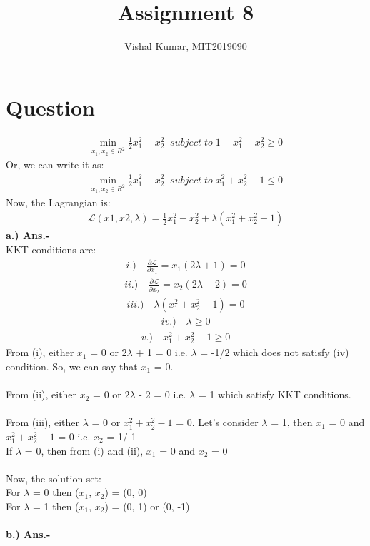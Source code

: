 \documentclass[fleqn]{article}
\title{Assignment 8}
\author{Vishal Kumar, MIT2019090}
\date{}
\begin{document}
\maketitle
\section*{Question}
\begin{align*}
\min_{x_1,x_2 \in R^2} \frac{1}{2} x_1^2 - x_2^2 \;\; subject \; to \; 1 - x_1^2 - x_2^2 \ge 0
\end{align*}
Or, we can write it as:
\begin{align*}
\min_{x_1,x_2 \in R^2} \frac{1}{2} x_1^2 - x_2^2 \;\; subject \; to \; x_1^2 + x_2^2 - 1 \le 0 
\end{align*}
Now, the Lagrangian is:
\begin{align*}
\mathcal{L}(x1,x2,\lambda) = \frac{1}{2} x_1^2 - x_2^2 + \lambda(x_1^2 + x_2^2 - 1)
\end{align*}
{\bf a.) Ans.-}
\\

KKT conditions are:
\begin{align*}
i.)\quad  \frac{\partial \mathcal{L}}{\partial x_1} = x_1(2\lambda +1) = 0 
\end{align*}
\begin{align*}
ii.)\quad  \frac{\partial \mathcal{L}}{\partial x_2} = x_2(2\lambda -2) = 0 
\end{align*}
\begin{align*}
iii.)\quad \lambda( x_1^2 + x_2^2 - 1) = 0 
\end{align*}
\begin{align*}
iv.)\quad \lambda \geq 0
\end{align*}
\begin{align*}
v.)\quad x_1^2 + x_2^2 - 1 \geq 0
\end{align*}
From (i), either $x_1$ = 0 or 2$\lambda$ + 1 = 0 i.e. $\lambda$ = -1/2 which does not satisfy (iv) condition. So, we can say that $x_1$ = 0.
\\
\\
From (ii), either $x_2$ = 0 or $2\lambda$ - 2 = 0 i.e. $\lambda$ = 1 which satisfy KKT conditions.
\\
\\
From (iii), either $\lambda$ = 0 or $x_1^2 + x_2^2 - 1$ = 0.
Let's consider $\lambda$ = 1, then $x_1$ = 0 and $x_1^2 + x_2^2 - 1$ = 0 i.e. $x_2$ = 1/-1
\\
If $\lambda$ = 0, then from (i) and (ii), $x_1$ = 0 and $x_2$ = 0
\\
\\
Now, the solution set:
\\
For $\lambda$ = 0 then ($x_1$, $x_2$) = (0, 0)
\\
For $\lambda$ = 1 then ($x_1$, $x_2$) = (0, 1) or (0, -1)
\\
\\
{\bf b.) Ans.-}
\\
\end{document}
